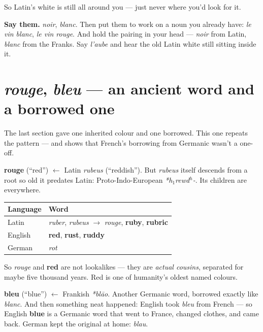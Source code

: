So Latin's white is still all around you --- just never where you'd look for it.

\begin{grammarlens}
\textbf{Say them.} \emph{noir}, \emph{blanc}. Then put them to work on a noun
you already have: \emph{le vin blanc}, \emph{le vin rouge}. And hold the pairing
in your head --- \emph{noir} from Latin, \emph{blanc} from the Franks. Say
\emph{l'aube} and hear the old Latin white still sitting inside it.
\end{grammarlens}

\section[\emph{rouge} and \emph{bleu}]{\emph{rouge}, \emph{bleu} --- an ancient word and a borrowed one}
\label{lesson:rouge-bleu}

The last section gave one inherited colour and one borrowed. This one repeats
the pattern --- and shows that French's borrowing from Germanic wasn't a
one-off.

\begin{cousinweb}
\textbf{rouge} (``red'') $\leftarrow$ Latin \emph{rubeus} (``reddish''). But
\emph{rubeus} itself descends from a root so old it predates Latin:
Proto-Indo-European \emph{*h$_1$rewd$^h$-}. Its children are everywhere.
\end{cousinweb}

\begin{center}
\begin{tabular}{@{}ll@{}}
\toprule
Language & Word \\
\midrule
Latin & \emph{ruber}, \emph{rubeus} $\to$ \emph{rouge}, \textbf{ruby}, \textbf{rubric} \\
English & \textbf{red}, \textbf{rust}, \textbf{ruddy} \\
German & \emph{rot} \\
\bottomrule
\end{tabular}
\end{center}

So \emph{rouge} and \textbf{red} are not lookalikes --- they are \emph{actual
cousins}, separated for maybe five thousand years. Red is one of humanity's
oldest named colours.

\begin{cousinweb}
\textbf{bleu} (``blue'') $\leftarrow$ Frankish \emph{*bl\=ao}. Another Germanic
word, borrowed exactly like \emph{blanc}. And then something neat happened:
English took \emph{bleu} from French --- so English \textbf{blue} is a Germanic
word that went to France, changed clothes, and came back. German kept the
original at home: \emph{blau}.
\end{cousinweb}

